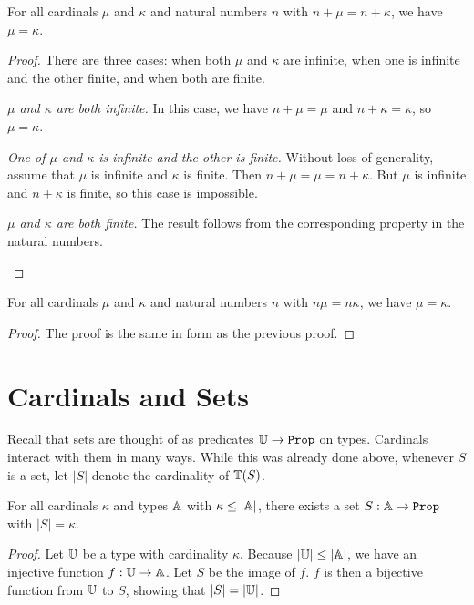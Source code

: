\documentclass[../../math.tex]{subfiles}
\begin{document}
\begin{theorem} \label{card_nat_plus_lcancel} \label{card_nat_plus_rcancel}
    For all cardinals $\mu$ and $\kappa$ and natural numbers $n$ with $n + \mu =
    n + \kappa$, we have $\mu = \kappa$.
\end{theorem}
\begin{proof}
    There are three cases: when both $\mu$ and $\kappa$ are infinite, when one
    is infinite and the other finite, and when both are finite.
    \setcounter{case}{0}
    \begin{case} \textit{$\mu$ and $\kappa$ are both infinite.}
        In this case, we have $n + \mu = \mu$ and $n + \kappa = \kappa$, so $\mu
        = \kappa$.
    \end{case}
    \begin{case} \textit{One of $\mu$ and $\kappa$ is infinite and the other is
        finite.}
        Without loss of generality, assume that $\mu$ is infinite and $\kappa$
        is finite.  Then $n + \mu = \mu = n + \kappa$.  But $\mu$ is infinite
        and $n + \kappa$ is finite, so this case is impossible.
    \end{case}
    \begin{case} \textit{$\mu$ and $\kappa$ are both finite.}
        The result follows from the corresponding property in the natural
        numbers.
    \end{case}
\end{proof}

\begin{theorem} \label{card_nat_mult_lcancel} \label{card_nat_mult_rcancel}
    For all cardinals $\mu$ and $\kappa$ and natural numbers $n$ with $n \mu =
    n \kappa$, we have $\mu = \kappa$.
\end{theorem}
\begin{proof}
    The proof is the same in form as the previous proof.
\end{proof}

\section{Cardinals and Sets}

Recall that sets are thought of as predicates $\U \to \Prop$ on types.
Cardinals interact with them in many ways.  While this was already done above,
whenever $S$ is a set, let $|S|$ denote the cardinality of $\mathbb{T}(S)$.

\begin{theorem} \label{card_le_sub}
    For all cardinals $\kappa$ and types $\mathbb{A}$ with $\kappa \leq |\mathbb{A}|$, there
    exists a set $S : \A \to \Prop$ with $|S| = \kappa$.
\end{theorem}
\begin{proof}
    Let $\mathbb{U}$ be a type with cardinality $\kappa$.  Because $|\mathbb{U}| \leq |\mathbb{A}|$, we
    have an injective function $f : \mathbb{U} \to \mathbb{A}$.  Let $S$ be the image of $f$.
    $f$ is then a bijective function from $\mathbb{U}$ to $S$, showing that $|S| =
    |\mathbb{U}|$.
\end{proof}
\end{document}
